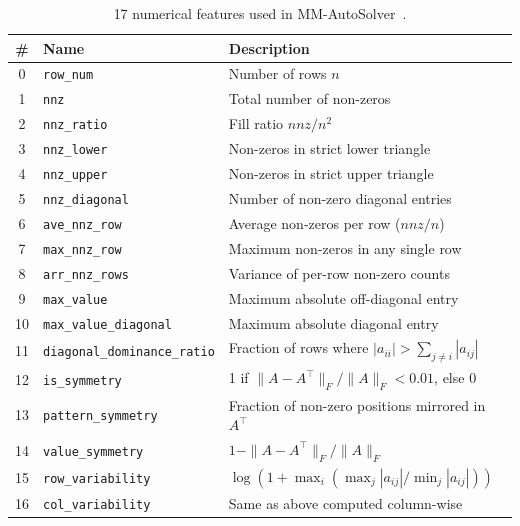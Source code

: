 \begin{table}[H]
  \centering
  \caption{17 numerical features used in MM-AutoSolver~\cite{xiong2025mmautosolver}.}
  \label{tab:features-mm}
  \begin{tabular}{clp{7cm}}
    \toprule
    \# & Name & Description \\
    \midrule
    0  & \texttt{row\_num}                  & Number of rows $n$ \\
    1  & \texttt{nnz}                       & Total number of non-zeros \\
    2  & \texttt{nnz\_ratio}                & Fill ratio $\mathit{nnz}/n^2$ \\
    3  & \texttt{nnz\_lower}                & Non-zeros in strict lower triangle \\
    4  & \texttt{nnz\_upper}                & Non-zeros in strict upper triangle \\
    5  & \texttt{nnz\_diagonal}             & Number of non-zero diagonal entries \\
    6  & \texttt{ave\_nnz\_row}             & Average non-zeros per row ($\mathit{nnz}/n$) \\
    7  & \texttt{max\_nnz\_row}             & Maximum non-zeros in any single row \\
    8  & \texttt{arr\_nnz\_rows}            & Variance of per-row non-zero counts \\
    9  & \texttt{max\_value}                & Maximum absolute off-diagonal entry \\
    10 & \texttt{max\_value\_diagonal}      & Maximum absolute diagonal entry \\
    11 & \texttt{diagonal\_dominance\_ratio}& Fraction of rows where $|a_{ii}| > \sum_{j \neq i}|a_{ij}|$ \\
    12 & \texttt{is\_symmetry}              & 1 if $\|A - A^\top\|_F / \|A\|_F < 0.01$, else 0 \\
    13 & \texttt{pattern\_symmetry}         & Fraction of non-zero positions mirrored in $A^\top$ \\
    14 & \texttt{value\_symmetry}           & $1 - \|A - A^\top\|_F / \|A\|_F$ \\
    15 & \texttt{row\_variability}          & $\log(1 + \max_i(\max_j|a_{ij}| / \min_j|a_{ij}|))$ \\
    16 & \texttt{col\_variability}          & Same as above computed column-wise \\
    \bottomrule
  \end{tabular}
\end{table}


